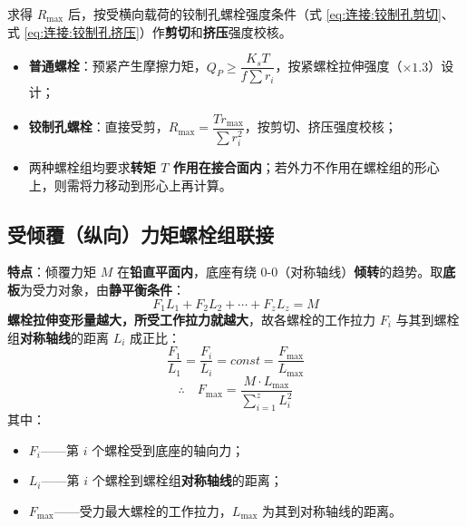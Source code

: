 求得 $R_{\max}$ 后，按受横向载荷的铰制孔螺栓强度条件（式 \eqref{eq:连接:铰制孔剪切}、式 \eqref{eq:连接:铰制孔挤压}）作\textbf{剪切}和\textbf{挤压}强度校核。

\begin{keybox}[受扭矩螺栓组小结]
\begin{itemize}
	\item \textbf{普通螺栓}：预紧产生摩擦力矩，$Q_P\ge\dfrac{K_sT}{f\sum r_i}$，按紧螺栓拉伸强度（$\times1.3$）设计；
	\item \textbf{铰制孔螺栓}：直接受剪，$R_{\max}=\dfrac{Tr_{\max}}{\sum r_i^{2}}$，按剪切、挤压强度校核；
	\item 两种螺栓组均要求\textbf{转矩 $T$ 作用在接合面内}；若外力不作用在螺栓组的形心上，则需将力移动到形心上再计算。
\end{itemize}
\end{keybox}

\subsection{受倾覆（纵向）力矩螺栓组联接}
\label{subsec:受倾覆力矩}

\begin{definition}[受倾覆力矩螺栓组的特点]
\label{def:倾覆力矩特点}
\textbf{特点}：倾覆力矩 $M$ 在\textbf{铅直平面内}，底座有绕 $0$-$0$（对称轴线）\textbf{倾转}的趋势。取\textbf{底板}为受力对象，由\textbf{静平衡条件}：
\begin{equation}
	F_1L_1+F_2L_2+\cdots+F_zL_z=M
	\label{eq:连接:倾覆静平衡}
\end{equation}
\textbf{螺栓拉伸变形量越大，所受工作拉力就越大}，故各螺栓的工作拉力 $F_i$ 与其到螺栓组\textbf{对称轴线}的距离 $L_i$ 成正比：
\begin{equation}
	\frac{F_1}{L_1}=\frac{F_i}{L_i}=const=\frac{F_{\max}}{L_{\max}}
	\label{eq:连接:倾覆比例关系}
\end{equation}
\begin{equation}
	\therefore\quad F_{\max}=\frac{M\cdot L_{\max}}{\displaystyle\sum_{i=1}^{z}L_i^{2}}
	\label{eq:连接:倾覆最大拉力}
\end{equation}
其中：
\begin{itemize}
	\item $F_i$——第 $i$ 个螺栓受到底座的轴向力；
	\item $L_i$——第 $i$ 个螺栓到螺栓组\textbf{对称轴线}的距离；
	\item $F_{\max}$——受力最大螺栓的工作拉力，$L_{\max}$ 为其到对称轴线的距离。
\end{itemize}
\end{definition}

